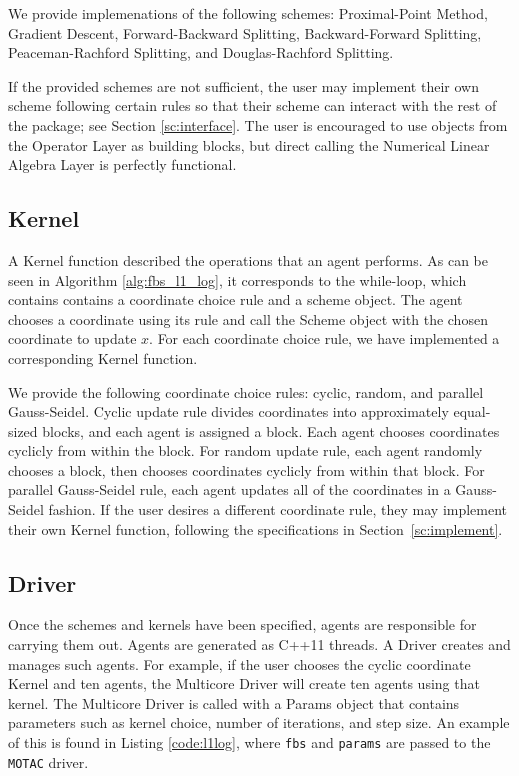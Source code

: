 We provide implemenations of the following schemes:  Proximal-Point Method,  Gradient Descent, Forward-Backward Splitting, Backward-Forward Splitting, Peaceman-Rachford Splitting, and Douglas-Rachford Splitting.

If the provided schemes are not sufficient, the user may implement their own scheme following certain rules so that their scheme can interact with the rest of the package; see Section \ref{sc:interface}.
The user is encouraged to use objects from the Operator Layer as building blocks, but direct calling the Numerical Linear Algebra Layer is perfectly functional. %

\subsection{Kernel}
A Kernel function described the operations that an agent performs.
As can be seen in Algorithm \ref{alg:fbs_l1_log}, it corresponds to the while-loop, which contains contains a coordinate choice rule and a scheme object.
The agent chooses a coordinate using its rule and call the Scheme object with the chosen coordinate to update $x$.
For each coordinate choice rule, we have implemented a corresponding Kernel function.

We provide the following coordinate choice rules: cyclic, random, and parallel Gauss-Seidel. 
Cyclic update rule divides coordinates into approximately equal-sized blocks, and each agent is assigned a block.
Each agent chooses coordinates cyclicly from within the block. 
For random update rule, each agent randomly chooses a block, then chooses coordinates cyclicly from within that block.
For parallel Gauss-Seidel rule, each agent updates all of the coordinates in a Gauss-Seidel fashion. 
If the user desires a different coordinate rule, they may implement their own Kernel function, following the specifications in Section~\ref{sc:implement}.


\subsection{Driver}

Once the schemes and kernels have been specified, agents are responsible for carrying them out. Agents are generated as C++11 threads.
A Driver creates and manages such agents.
For example, if the user chooses the cyclic coordinate Kernel and ten agents, the Multicore Driver will create ten agents using that kernel. %
The Multicore Driver is called with a Params object that contains parameters such as kernel choice, number of iterations, and step size.
An example of this is found in Listing \ref{code:l1log}, where \texttt{fbs} and \texttt{params} are passed to the \texttt{MOTAC} driver.

